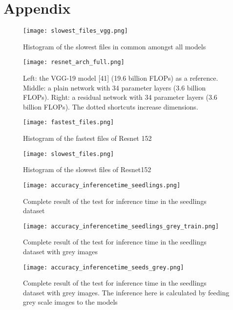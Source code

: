 
\chapter{Appendix}

\begin{figure}[ht]
       \centering 
	    \texttt{[image: slowest\_files\_vgg.png]}
        \caption{Histogram of the slowest files in common amongst all models}
         \label{fig:slowest_files_all}
\end{figure}

\begin{figure}[ht]
       \centering 
	    \texttt{[image: resnet\_arch\_full.png]}
        \caption[Example of the architecture of residual networks]{ Left: the VGG-19 model [41] (19.6 billion FLOPs) as a reference. Middle: a plain network with 34 parameter layers (3.6 billion FLOPs). Right: a residual network with 34 parameter layers (3.6 billion FLOPs). The dotted shortcuts increase dimensions.\cite{DBLP:journals/corr/HeZRS15}}
         \label{fig:resnet_arch_full}
\end{figure}
\begin{figure}[ht]
       \centering 
	    \texttt{[image: fastest\_files.png]}
        \caption{Histogram of the fastest files of Resnet 152}
         \label{fig:fastest_files_his}
\end{figure}

\begin{figure}[ht]
       \centering 
	    \texttt{[image: slowest\_files.png]}
        \caption{Histogram of the slowest files of Resnet152}
         \label{fig:slowest_files_his}
\end{figure}



\begin{figure}[ht]
       \centering 
	    \texttt{[image: accuracy\_inferencetime\_seedlings.png]}
        \caption{Complete result of the test for inference time in the seedlings dataset}
         \label{fig:accuracy_inferencetime_seedlings}
\end{figure}


\begin{figure}[ht]
       \centering 
	    \texttt{[image: accuracy\_inferencetime\_seedlings\_grey\_train.png]}
        \caption{Complete result of the test for inference time in the seedlings dataset with grey images}
         \label{fig:accuracy_inferencetime_seedlings_grey_train}
\end{figure}

\begin{figure}[ht]
       \centering 
	    \texttt{[image: accuracy\_inferencetime\_seeds\_grey.png]}
        \caption{Complete result of the test for inference time in the seedlings dataset with grey images. The inference here is calculated by feeding grey scale images to the models}
         \label{fig:accuracy_inferencetime_seeds_grey}
\end{figure}